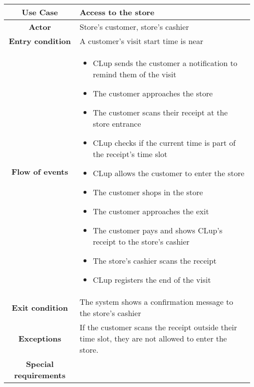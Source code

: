 \documentclass[../../main.tex]{subfiles}
\begin{document}
    \begin{table}[H]
      \centering
        \begin{tabular}{c m{}}
        \hline
        \textbf{Use Case} & Access to the store\\ \hline
        \textbf{Actor} & Store's customer, store's cashier\\ \hline
        \textbf{Entry condition} & A customer's visit start time is near\\  \hline
        \textbf{Flow of events} & \begin{itemize}
                                    \item CLup sends the customer a notification to remind them of the visit
                                    \item The customer approaches the store
                                    \item The customer scans their receipt at the store entrance
                                    \item CLup checks if the current time is part of the receipt's time slot
                                    \item CLup allows the customer to enter the store
                                    \item The customer shops in the store
                                    \item The customer approaches the exit
                                    \item The customer pays and shows CLup's receipt to the store's cashier
                                    \item The store's cashier scans the receipt
                                    \item CLup registers the end of the visit
                                  \end{itemize}\\ \hline
        \textbf{Exit condition} & The system shows a confirmation message to the store's cashier \\ \hline
        \textbf{Exceptions} & If the customer scans the receipt outside their time slot, they are not allowed to enter the store. \\ \hline
        \textbf{Special requirements} &\\ \hline
        \end{tabular}
    \end{table}

        
\end{document}
